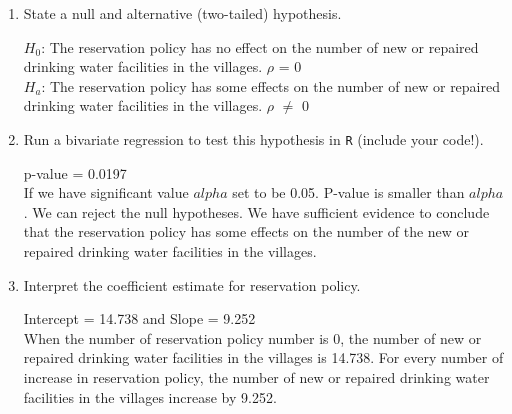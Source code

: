 \documentclass[12pt,letterpaper]{article}
\begin{document}
\newpage
\begin{enumerate}
	\item [(a)] State a null and alternative (two-tailed) hypothesis. \\
	\begin{doublespace}
		$H_0$: The reservation policy has no effect on the number of new or repaired drinking water facilities in the villages. $\rho$ = 0 \\
		$H_a$: The reservation policy has some effects on the number of new or repaired drinking water facilities in the villages. $\rho$ $\neq$ 0
		
	\end{doublespace}

	\vspace{6cm}
	\item [(b)] Run a bivariate regression to test this hypothesis in \texttt{R} (include your code!).
	\begin{doublespace}
		
		p-value = 0.0197 \\ 
		If we have significant value $alpha$ set to be 0.05. P-value is smaller than $alpha$. We can reject the null hypotheses. We have sufficient evidence to conclude that the reservation policy has some effects on the number of the new or repaired drinking water facilities in the villages.
	\end{doublespace}
	\vspace{6cm}
	\item [(c)] Interpret the coefficient estimate for reservation policy. 
	
	\begin{doublespace}
		
		Intercept = 14.738 and Slope = 9.252 \\
		When the number of reservation policy number is 0, the number of new or repaired drinking water facilities in the villages is 14.738. For every number of increase in reservation policy, the number of new or repaired drinking water facilities in the villages increase by 9.252.
	\end{doublespace}
\end{enumerate}


\end{document}
